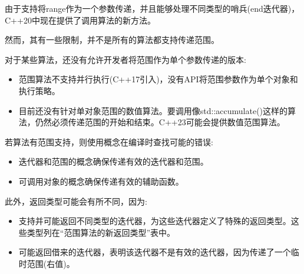 
由于支持将range作为一个参数传递，并且能够处理不同类型的哨兵(end迭代器)，C++20中现在提供了调用算法的新方法。

然而，其有一些限制，并不是所有的算法都支持传递范围。


对于某些算法，还没有允许开发者将范围作为单个参数传递的版本:

\begin{itemize}
\item
范围算法不支持并行执行(C++17引入)，没有API将范围参数作为单个对象和执行策略。

\item
目前还没有针对单对象范围的数值算法。要调用像std::accumulate()这样的算法，仍然必须传递范围的开始和结束。C++23可能会提供数值范围算法。
\end{itemize}

若算法有范围支持，则使用概念在编译时查找可能的错误:

\begin{itemize}
\item
迭代器和范围的概念确保传递有效的迭代器和范围。

\item
可调用对象的概念确保传递有效的辅助函数。
\end{itemize}

此外，返回类型可能会有所不同，因为:

\begin{itemize}
\item
支持并可能返回不同类型的迭代器，为这些迭代器定义了特殊的返回类型。这些类型列在“范围算法的新返回类型”表中。

\item
可能返回借来的迭代器，表明该迭代器不是有效的迭代器，因为传递了一个临时范围(右值)。
\end{itemize}


